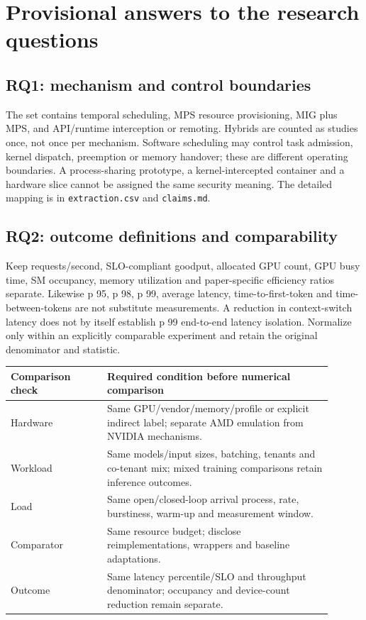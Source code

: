\documentclass[12pt,a 4paper]{article}
\begin{document}
\section{Provisional answers to the research questions}
\subsection{RQ1: mechanism and control boundaries}
The set contains temporal scheduling, MPS resource provisioning, MIG plus MPS, and API/runtime interception or remoting. Hybrids are counted as studies once, not once per mechanism. Software scheduling may control task admission, kernel dispatch, preemption or memory handover; these are different operating boundaries. A process-sharing prototype, a kernel-intercepted container and a hardware slice cannot be assigned the same security meaning. The detailed mapping is in \texttt{extraction.csv} and \texttt{claims.md}.

\subsection{RQ2: outcome definitions and comparability}
Keep requests/second, SLO-compliant goodput, allocated GPU count, GPU busy time, SM occupancy, memory utilization and paper-specific efficiency ratios separate. Likewise p 95, p 98, p 99, average latency, time-to-first-token and time-between-tokens are not substitute measurements. A reduction in context-switch latency does not by itself establish p 99 end-to-end latency isolation. Normalize only within an explicitly comparable experiment and retain the original denominator and statistic.

\begin{longtable}{P{0.27\linewidth}P{0.63\linewidth}}
\toprule Comparison check & Required condition before numerical comparison\\\midrule\endhead
Hardware & Same GPU/vendor/memory/profile or explicit indirect label; separate AMD emulation from NVIDIA mechanisms.\\
Workload & Same models/input sizes, batching, tenants and co-tenant mix; mixed training comparisons retain inference outcomes.\\
Load & Same open/closed-loop arrival process, rate, burstiness, warm-up and measurement window.\\
Comparator & Same resource budget; disclose reimplementations, wrappers and baseline adaptations.\\
Outcome & Same latency percentile/SLO and throughput denominator; occupancy and device-count reduction remain separate.\\
\bottomrule\end{longtable}
\end{document}
